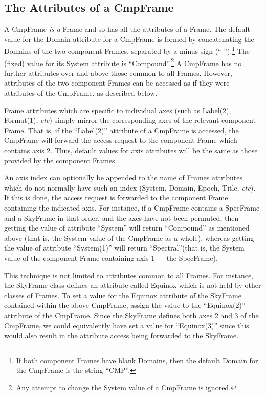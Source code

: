 \documentclass[twoside,11pt]{article}
\begin{document}
\subsection{The Attributes of a CmpFrame}

A CmpFrame \emph{is a} Frame and so has all the attributes of a Frame.
The default value for the Domain attribute for a CmpFrame is formed by
concatenating the Domains of the two component Frames, separated by a
minus sign (``-'').\footnote{If both component Frames have blank Domains, 
then the default Domain for the CmpFrame is the string ``CMP''.} The (fixed) 
value for its System attribute is ``Compound''.\footnote{Any attempt to 
change the System value of a CmpFrame is ignored.} A CmpFrame has no 
further attributes over and above those common to all Frames. However,
attributes of the two component Frames can be accessed as if they were
attributes of the CmpFrame, as described below.

Frame attributes which are specific to individual axes (such as Label(2),
Format(1), \emph{etc}) simply mirror the corresponding axes of the
relevant component Frame. That is, if the ``Label(2)'' attribute of a
CmpFrame is accessed, the CmpFrame will forward the access request to the
component Frame which contains axis 2. Thus, default values for axis
attributes will be the same as those provided by the component Frames.

An axis index can optionally be appended to the name of Frames attributes
which do not normally have such an index (System, Domain, Epoch, Title,
\emph{etc}). If this is done, the access request is forwarded to the
component Frame containing the indicated axis. For instance, if a
CmpFrame contains a SpecFrame and a SkyFrame in that order, and the axes
have not been permuted, then getting the value of attribute ``System'' will 
return  ``Compound'' as mentioned above (that is, the System value of the
CmpFrame as a whole), whereas getting the value of attribute
``System(1)'' will return ``Spectral''(that is, the System value of the
component Frame containing axis 1 --- the SpecFrame).

This technique is not limited to attributes common to all Frames. For
instance, the SkyFrame class defines an attribute called Equinox which is
not held by other classes of Frames. To set a value for the Equinox
attribute of the SkyFrame contained within the above CmpFrame, assign the
value to the ``Equinox(2)'' attribute of the CmpFrame. Since the SkyFrame
defines both axes 2 and 3 of the CmpFrame, we could equivalently have set
a value for ``Equinox(3)'' since this would also result in the attribute
access being forwarded to the SkyFrame.
\end{document}

